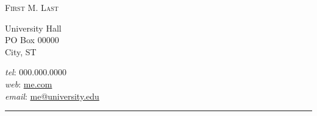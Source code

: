 \documentclass[11pt]{article}
\makeatletter
\newcommand{\myname}{First M. Last}     %
\newcommand{\websiteurl}{{https://github.com/btskinner/tex_cv}} %
\newcommand{\websitename}{me.com}       %
\newcommand{\phone}{000.000.0000}       %
\newcommand{\email}{me@university.edu}  %
\newcommand{\address}{                  %
  University Hall \\
  PO Box 00000 \\            
  City, ST
}
\newcommand{\RR}{\raggedright\arraybackslash} %
\makeatother
\begin{document}
\thispagestyle{first}


\hspace*{-\parindent}%
\begin{center}
  \vspace{-2em}
  {\LARGE\scshape \myname} \\
\end{center}
\begin{minipage}[t]{.6\linewidth}
\address
\end{minipage}
\hspace*{-\parindent}%
\begin{minipage}[t]{.43\linewidth}
\begin{flushright}
  \textit{tel}: \phone \\
  \textit{web}: \href{\websiteurl}{\websitename} \\
  \textit{email}: \href{mailto:\email}{\email}
\end{flushright}
\end{minipage}
\begin{center}
  \vspace{-.5em}
  \rule{\textwidth}{1pt}  
\end{center}





\end{document}
